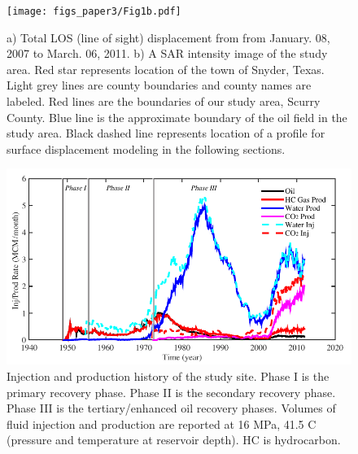 \clearpage
\begin{figure}
\centering
\texttt{[image: figs\_paper3/Fig1b.pdf]}	
\caption{a) Total LOS (line of sight) displacement from from January. 08, 2007 to March. 06, 2011. b) A SAR intensity image of the study area.  Red star represents location of the town of Snyder, Texas.  Light grey lines are county boundaries and county names are labeled.  Red lines are the boundaries of our study area, Scurry County.  Blue line is the approximate boundary of the oil field in the study area.  Black dashed line represents location of a profile for surface displacement modeling in the following sections.}
\label{fig:map_los_b}
\end{figure}

\clearpage
\begin{figure}
	\centering
	\includegraphics{figs_paper3/Fig2.pdf}	
	\caption{Injection and production history of the study site.  Phase I is the primary recovery phase.  Phase II is the secondary recovery phase.  Phase III is the tertiary/enhanced oil recovery phases.  Volumes of fluid injection and production are reported at 16 MPa, 41.5 \textordmasculine C (pressure and temperature at reservoir depth). HC is hydrocarbon.}
	\label{fig:inj_pro_hist}
\end{figure}

